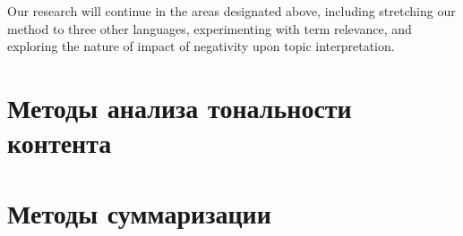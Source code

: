 Our research will continue in the areas designated above, including stretching our method to three other languages, experimenting with term relevance, and exploring the nature of impact of negativity upon topic interpretation.

\section{Методы анализа тональности контента}\label{sec:ch5/sect3}

\section{Методы суммаризации}\label{sec:ch5/sect4}

\FloatBarrier


